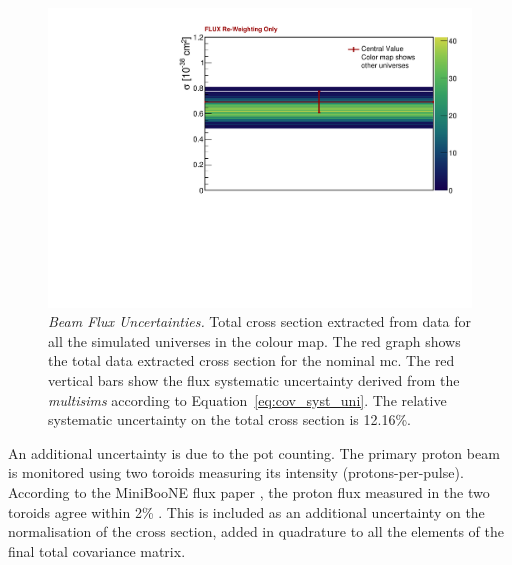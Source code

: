 \begin{figure}[]
\centering
\includegraphics[width=.70\textwidth]{images/flux_covariance_plots/flux_multisim_onebin_xsec_all_fancy}
\caption[Beam Flux Uncertainties - Total Cross Section - Universes Distributions]{\emph{Beam Flux Uncertainties.} Total cross section extracted from data for all the simulated universes in the colour map. The red graph shows the total data extracted cross section for the nominal \acrshort{mc}. The red vertical bars show the flux systematic uncertainty derived from the \emph{multisims} according to Equation~\eqref{eq:cov_syst_uni}. The relative systematic uncertainty on the total cross section is 12.16\%.}
\label{fig:flux_multisim_onebin}
\end{figure}

An additional uncertainty is due to the \acrshort{pot} counting. The primary proton beam is monitored using two toroids measuring its intensity (protons-per-pulse). According to the MiniBooNE flux paper \cite{miniboone_flux}, the proton flux measured in the two toroids agree within 2\% . This is included as an additional uncertainty on the normalisation of the cross section, added in quadrature to all the elements of the final total covariance matrix.


